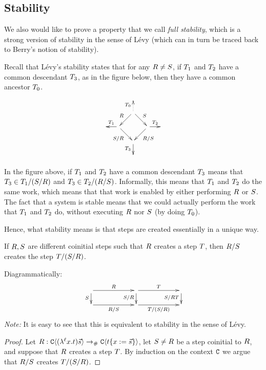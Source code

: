 \bigskip
\subsection*{Stability}

We also would like to prove a property that we call \emph{full stability},
which is a strong version of stability in the sense of Lévy \cite{levy_redex_stability}
(which can in turn be traced back to Berry's notion of stability).

Recall that L\'evy's stability states that for any $R \neq S$,
if $T_1$ and $T_2$ have a common descendant $T_3$, as in the figure below,
then they have a common ancestor $T_0$.
\[
  \xymatrix@C=.5cm@R=.5cm{
    &&&
  \\
    &
    & \ar@{.>}[u]^{\redexthree_0} \ar[dl]_{\redex} \ar[dr]^{\redextwo} &
  \\
    &
    \ar[l]_{\redexthree_1}
    \ar[dr]_{\redextwo/\redex} & & \ar[dl]^{\redex/\redextwo} \ar[r]^{\redexthree_2} &
  \\
    &
    & \ar[d]_{\redexthree_3} &
  \\
    &&&
  }
\]

In the figure above, if $T_1$ and $T_2$ have a common descendant
$T_3$ means that $T_3 \in T_1 / (S / R)$
and $T_3 \in T_2 / (R / S)$.
Informally, this means that $T_1$ and $T_2$ do the same work,
which means that that work is enabled by either performing $R$ or $S$.
The fact that a system is stable means that we could actually perform the work that
$T_1$ and $T_2$ do, without executing $R$ nor $S$
(by doing $T_0$).

Hence, what stability means is that steps are created essentially in a unique way.


\begin{lemma}[Stability]
If $R,S$ are different coinitial steps such that
$R$ creates a step $T$,
then $R/S$ creates the step $T/(S/R)$.

Diagrammatically:
\[
  \xymatrix@R=.5cm@C=2cm{
    \ar[r]^{\redex}
    \ar[d]_{\redextwo}
    &
    \ar[r]^{\redexthree}
    \ar[d]_{\redextwo/\redex}
    &
    \ar[d]_{\redextwo/\redex\redexthree}
  \\
    \ar[r]_{\redex/\redextwo}
    &
    \ar[r]_{\redexthree/(\redextwo/\redex)}
    &
  }
\]
\emph{Note:} It is easy to see that this is equivalent to stability in the sense of Lévy.
\end{lemma}
\begin{proof}
Let $R : \mathtt{C}\langle(\lambda^{\ell} x. t)\vec{s}\rangle \mathrel{\to_{\mathtt{\#}}} \mathtt{C}\langle t\{x := \vec{s}\}\rangle$,
let $S \neq R$ be a step coinitial to $R$,
and suppose that $R$ creates a step $T$.
By induction on the context $\mathtt{C}$ we argue that $R/S$ creates $T/(S/R)$.
\end{proof}

